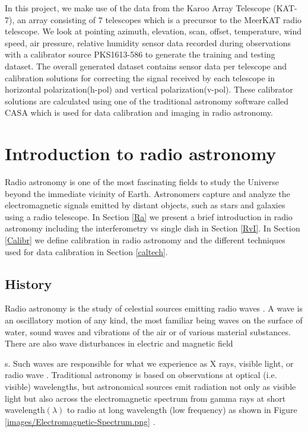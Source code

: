 In this project, we make use of the data from the Karoo Array Telescope (KAT-7), an array consisting of $7$ telescopes which is a precursor to the MeerKAT radio telescope. We look at pointing azimuth, elevation, scan, offset, temperature, wind speed, air pressure, relative humidity sensor data recorded during  observations with a calibrator source PKS1613-586 to generate the training and testing dataset. The overall generated dataset contains sensor data per telescope and calibration solutions for correcting the signal received by each telescope in horizontal polarization(h-pol)  and vertical polarization(v-pol). These calibrator solutions are calculated using one of the traditional astronomy software called CASA which is used for data calibration and imaging in radio astronomy.
 
\section{Introduction to radio astronomy}

Radio astronomy is one of the most fascinating fields to study the Universe beyond the immediate vicinity of Earth. Astronomers capture and analyze the electromagnetic signals emitted by distant objects, such as stars and galaxies using a radio telescope. In Section \ref{Ra} we present a brief introduction in radio astronomy including the interferometry vs single dish in Section \ref{RvI}. In Section \ref{Calibr} we define calibration in radio astronomy and the different techniques used for data calibration in Section \ref{caltech}.
\label{Ra}
\subsection{History}


Radio astronomy is the study of celestial sources emitting radio waves \citep{verschuur2015invisible}. A wave is an oscillatory motion of any kind, the most familiar being waves on the surface of water, sound waves and vibrations of the air or of various material substances. There are also wave disturbances in electric and magnetic field\newtheorem{mydef}{Definition}s. Such waves are responsible for what we experience as X rays, visible light, or radio wave \citep{cassidy2002wave}. Traditional astronomy is based on observations at optical (i.e. visible) wavelengths, but astronomical sources emit radiation not only as visible light but
also across the electromagnetic spectrum from gamma rays at short wavelength$(\lambda)$ to radio at long wavelength (low frequency) as shown in Figure \ref{images/Electromagnetic-Spectrum.png} \citep{staats2016genetic}.

